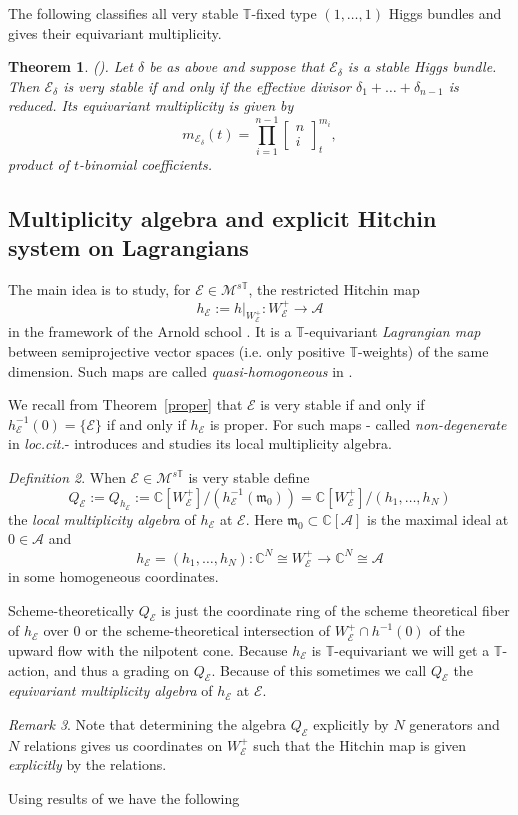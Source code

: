 \documentclass[12pt]{article}
\numberwithin{equation}{section}
\newtheorem{theorem}{Theorem}
\theoremstyle{remark}
\newtheorem{remark}[theorem]{Remark}
\newtheorem{definition}[theorem]{Definition}
\numberwithin{theorem}{section}
\def\calE{{\mathcal E}}
\def\C{\mathbb{C}}
\def\M{{\mathcal{M}}}
\def\calA{{\mathcal{A}}}
\newcommand{\T}{{\mathbb{T}}}
\numberwithin{equation}{section}
\begin{document}
The following classifies all very stable   $\T$-fixed type $(1,\dots,1)$ Higgs bundles and gives their equivariant multiplicity.

\begin{theorem}(\cite[Theorem 4.16,(5.18)]{hausel-hitchin}). \label{mult111} Let $\delta$ be as above and suppose that $\calE_\delta$ is a stable Higgs bundle. Then $\calE_\delta$ is very stable if and only if the effective divisor $\delta_1+\dots+\delta_{n-1}$ is reduced. Its equivariant multiplicity is given by $$m_{\calE_\delta}(t)=\prod_{i=1}^{n-1}\left[\begin{array}{c} n \\ i \end{array}\right]^{m_i}_t,$$  product of $t$-binomial coefficients.
\end{theorem}



\subsection{Multiplicity algebra and explicit Hitchin system on Lagrangians}

The main idea is to study, for $\calE\in \M^{s\T}$, the  restricted Hitchin map $$h_\calE:=h|_{W^+_\calE}: W^+_\calE\to \calA$$ in the framework of the Arnold school \cite{arnold-etal}. It is a $\T$-equivariant {\em Lagrangian map} between semiprojective vector spaces (i.e. only positive $\T$-weights) of the same dimension. Such maps are called {\em quasi-homogoneous} in \cite[\S 12.3]{arnold-etal}
. 

We recall from Theorem~\ref{proper} that $\calE$ is very stable if and only if  $h_\calE^{-1}(0)=\{\calE\}$ if and only if $h_\calE$ is proper.  For such maps - called {\em non-degenerate} in {\em loc.cit.}- \cite[\S 4,5,12]{arnold-etal} introduces and studies its local multiplicity algebra.

\begin{definition} When $\calE\in \M^{s\T}$ is very stable define $$Q_\calE:=Q_{h_\calE}:= \C[W^+_\calE]/(h_\calE^{-1}({\mathfrak m}_0))=\C[W^+_\calE]/(h_1,\dots,h_N)$$ the {\em local multiplicity algebra} of $h_\calE$ at $\calE$.  Here ${\mathfrak m}_0\subset \C[\calA]$ is the maximal ideal at $0\in \calA$ and  $$h_\calE=(h_1,\dots,h_N):\C^N\cong W^+_\calE\to \C^N\cong \calA$$ in some homogeneous coordinates.
\end{definition}

Scheme-theoretically $Q_\calE$ is just the coordinate ring of the scheme theoretical fiber of $h_\calE$ over $0$ or the scheme-theoretical intersection of $W^+_\calE\cap h^{-1}(0)$ of the upward flow with the nilpotent cone. Because $h_\calE$ is $\T$-equivariant we will get a $\T$-action, and thus a grading on $Q_\calE$. Because of this sometimes we call $Q_\calE$ the {\em equivariant multiplicity algebra} of $h_\calE$ at ${\calE}$. \begin{remark} Note that determining the algebra $Q_\calE$ explicitly by $N$ generators and $N$ relations gives us coordinates on $W^+_\calE$ such that the Hitchin map is given {\em explicitly} by the relations. \end{remark} Using results of \cite[\S 4,5,12]{arnold-etal}  we have the following
\end{document}
